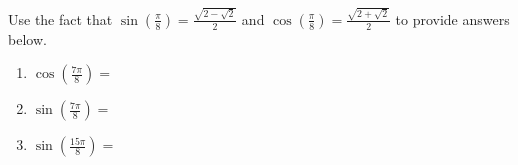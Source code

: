 \documentclass{ximera}
\author{Kenneth Berglund}
\begin{document}
\begin{exercise}
Use the fact that $\sin\left(\frac{\pi}{8}\right) = \frac{\sqrt{2 - \sqrt{2}}}{2}$ and $\cos\left(\frac{\pi}{8}\right) = \frac{\sqrt{2 + \sqrt{2}}}{2}$ to provide answers below.

\begin{enumerate}
\item $\cos\left(\frac{7\pi}{8}\right) =$ 
\begin{multipleChoice}
\end{multipleChoice}

\item $\sin\left(\frac{7\pi}{8}\right) =$ 
\begin{multipleChoice}
\end{multipleChoice}

\item $\sin\left(\frac{15\pi}{8}\right) =$  
\begin{multipleChoice}
\end{multipleChoice}

\end{enumerate}

\end{exercise}
\end{document}
